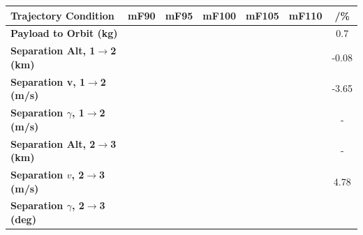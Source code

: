 \begin{table}[ht]
	\centering
	\begin{tabular}{l c c c c c c} 
		\hline \textbf{Trajectory Condition}
		&mF90
		&mF95
		&mF100
		&mF105
		&mF110
		& /\%
		\\
		\hline \textbf{Payload to Orbit (kg)}
		& \PayloadToOrbitmFuelNinetyNoReturn
		& \PayloadToOrbitmFuelNinetyFiveNoReturn
		& \PayloadToOrbitmFuelStandardNoReturn
		& \PayloadToOrbitmFuelOneHundredFiveNoReturn
		& \PayloadToOrbitmFuelOneHundredTenNoReturn
		&0.7
		\\
		\textbf{Separation Alt, 1$\rightarrow$2 (km)}
		& \firstsecondSeparationAltmFuelNinetyNoReturn
		& \firstsecondSeparationAltmFuelNinetyFiveNoReturn
		& \firstsecondSeparationAltmFuelStandardNoReturn
		& \firstsecondSeparationAltmFuelOneHundredFiveNoReturn
		& \firstsecondSeparationAltmFuelOneHundredTenNoReturn
		&-0.08
		\\
		\textbf{Separation v, 1$\rightarrow$2 (m/s)}
		& \firstsecondSeparationvmFuelNinetyNoReturn
		& \firstsecondSeparationvmFuelNinetyFiveNoReturn
		& \firstsecondSeparationvmFuelStandardNoReturn
		& \firstsecondSeparationvmFuelOneHundredFiveNoReturn
		& \firstsecondSeparationvmFuelOneHundredTenNoReturn
		&-3.65
		\\
		\textbf{Separation $\gamma$, 1$\rightarrow$2 (m/s)}
		& \firstsecondSeparationgammamFuelNinetyNoReturn
		& \firstsecondSeparationgammamFuelNinetyFiveNoReturn
		& \firstsecondSeparationgammamFuelStandardNoReturn
		& \firstsecondSeparationgammamFuelOneHundredFiveNoReturn
		& \firstsecondSeparationgammamFuelOneHundredTenNoReturn
		& -
		\\
		\textbf{Separation Alt, 2$\rightarrow$3 (km)}
		& \secondthirdSeparationAltmFuelNinetyNoReturn
		& \secondthirdSeparationAltmFuelNinetyFiveNoReturn
		& \secondthirdSeparationAltmFuelStandardNoReturn
		& \secondthirdSeparationAltmFuelOneHundredFiveNoReturn
		& \secondthirdSeparationAltmFuelOneHundredTenNoReturn
		& -
		\\
		\textbf{Separation $v$, 2$\rightarrow$3 (m/s)}
		& \secondthirdSeparationvmFuelNinetyNoReturn
		& \secondthirdSeparationvmFuelNinetyFiveNoReturn
		& \secondthirdSeparationvmFuelStandardNoReturn
		& \secondthirdSeparationvmFuelOneHundredFiveNoReturn
		& \secondthirdSeparationvmFuelOneHundredTenNoReturn
		&4.78
		\\
		\textbf{Separation $\gamma$, 2$\rightarrow$3 (deg)}
		& \secondthirdSeparationgammamFuelNinetyNoReturn
		& \secondthirdSeparationgammamFuelNinetyFiveNoReturn
		& \secondthirdSeparationgammamFuelStandardNoReturn

\end{tabular}
\end{table}
